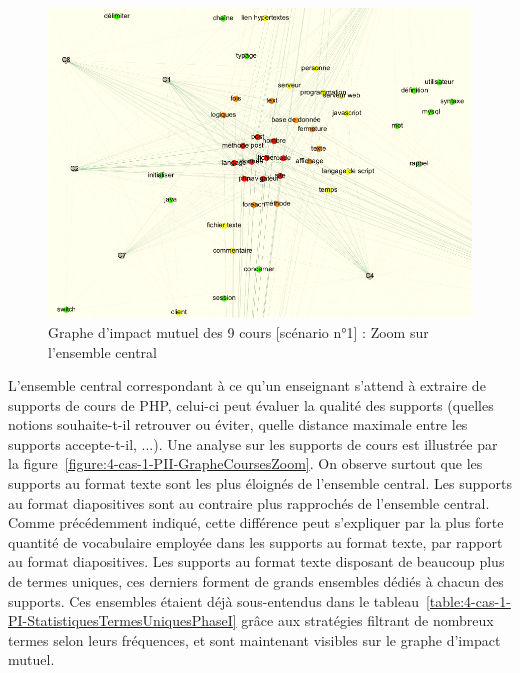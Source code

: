 \begin{figure}[htb!]
\centering
\centerline{  %
\includegraphics[scale=0.65]{4-Experiences/images/cas-1/graphe-Directe-core-zoom.png}
}
\caption{Graphe d'impact mutuel des 9 cours [scénario n°1] : Zoom sur l'ensemble central}
\label{figure:4-cas-1-PII-GrapheCoreZoom}
\end{figure}


\newpage

L'ensemble central correspondant à ce qu'un enseignant s'attend à extraire de supports de cours de PHP, celui-ci peut évaluer la qualité des supports (quelles notions souhaite-t-il retrouver ou éviter, quelle distance maximale entre les supports accepte-t-il, ...).
Une analyse sur les supports de cours est illustrée par la figure~\ref{figure:4-cas-1-PII-GrapheCoursesZoom}.
On observe surtout que les supports au format texte sont les plus éloignés de l'ensemble central.
Les supports au format diapositives sont au contraire plus rapprochés de l'ensemble central.
Comme précédemment indiqué, cette différence peut s'expliquer par la plus forte quantité de vocabulaire employée dans les supports au format texte, par rapport au format diapositives.
Les supports au format texte disposant de beaucoup plus de termes uniques, ces derniers forment de grands ensembles dédiés à chacun des supports.
Ces ensembles étaient déjà sous-entendus dans le tableau~\ref{table:4-cas-1-PI-StatistiquesTermesUniquesPhaseI} grâce aux stratégies filtrant de nombreux termes selon leurs fréquences, et sont maintenant visibles sur le graphe d'impact mutuel.



